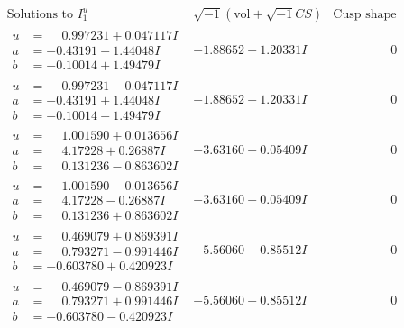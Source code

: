 \documentclass[1p]{elsarticle_modified}
\theoremstyle{definition}
\newcommand{\I}{\sqrt{-1}}
\begin{document}
$$\begin{array}{c|c|c}  
\text{Solutions to }I^u_{1}& \I (\text{vol} + \sqrt{-1}CS) & \text{Cusp shape}\\
 \hline 
\begin{aligned}
u &= \phantom{-}0.997231 + 0.047117 I \\
a &= -0.43191 - 1.44048 I \\
b &= -0.10014 + 1.49479 I\end{aligned}
 & -1.88652 - 1.20331 I & \phantom{-0.000000 } 0 \\ \hline\begin{aligned}
u &= \phantom{-}0.997231 - 0.047117 I \\
a &= -0.43191 + 1.44048 I \\
b &= -0.10014 - 1.49479 I\end{aligned}
 & -1.88652 + 1.20331 I & \phantom{-0.000000 } 0 \\ \hline\begin{aligned}
u &= \phantom{-}1.001590 + 0.013656 I \\
a &= \phantom{-}4.17228 + 0.26887 I \\
b &= \phantom{-}0.131236 - 0.863602 I\end{aligned}
 & -3.63160 - 0.05409 I & \phantom{-0.000000 } 0 \\ \hline\begin{aligned}
u &= \phantom{-}1.001590 - 0.013656 I \\
a &= \phantom{-}4.17228 - 0.26887 I \\
b &= \phantom{-}0.131236 + 0.863602 I\end{aligned}
 & -3.63160 + 0.05409 I & \phantom{-0.000000 } 0 \\ \hline\begin{aligned}
u &= \phantom{-}0.469079 + 0.869391 I \\
a &= \phantom{-}0.793271 - 0.991446 I \\
b &= -0.603780 + 0.420923 I\end{aligned}
 & -5.56060 - 0.85512 I & \phantom{-0.000000 } 0 \\ \hline\begin{aligned}
u &= \phantom{-}0.469079 - 0.869391 I \\
a &= \phantom{-}0.793271 + 0.991446 I \\
b &= -0.603780 - 0.420923 I\end{aligned}
 & -5.56060 + 0.85512 I & \phantom{-0.000000 } 0 \\ \hline\begin{aligned}

\end{aligned}
\end{array}$$
\end{document}
